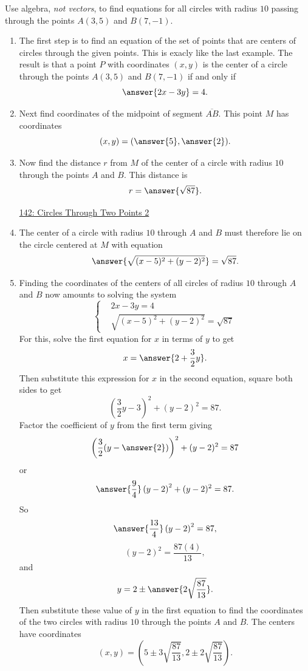 \documentclass{ximera}
\begin{document}
\begin{question} \label{Qdr383r7f3}
Use algebra, \emph{not vectors}, to find equations for all circles with radius $10$ passing through the points $A(3,5)$ and $B(7,-1)$.

\begin{explanation}
\begin{enumerate}
\item The first step is to find an equation of the set of points that are centers of circles through the given points. This is exacly like the last example. The result is that a point $P$ with coordinates $(x,y)$ is the center of a circle through the points $A(3,5)$ and $B(7,-1)$ if and only if
\[
   \answer{2x - 3y} = 4 .
\]

\item Next find coordinates of the midpoint of segment $\overline{AB}$. This point $M$ has coordinates
\[
   (x,y) = (\answer{5},\answer{2}) .
\] 

\item Now find the distance $r$ from $M$ of the center of a circle with radius $10$ through the points $A$ and $B$. This distance is
\[
   r = \answer{\sqrt{87}}.
\]

\begin{onlineOnly}
    \begin{center}
\end{center}
\end{onlineOnly}

\href{https://www.desmos.com/calculator/5hjdvplzkk}{142: Circles Through Two Points 2}



\item The center of a circle with radius $10$ through $A$ and $B$ must therefore lie on the circle centered at $M$ with equation 
\[
  \answer{\sqrt{(x-5)^2 + (y-2)^2}}   = \sqrt{87} .
\]

\item Finding the coordinates of the centers of all circles of radius $10$ through $A$ and $B$ now amounts to solving the system
\[
\begin{cases}
          & 2x - 3y = 4 \\
          &\sqrt{(x-5)^2 + (y-2)^2}   = \sqrt{87} 
\end{cases}
\]
For this, solve the first equation for $x$ in terms of $y$ to get
\[
    x = \answer{2 + \frac{3}{2}y} .
\]
Then substitute this expression for $x$ in the second equation, square both sides to get
\[
         \left( \frac{3}{2}y - 3\right)^2 + (y-2)^2 = 87.
\]
Factor the coefficient of $y$ from the first term giving
\[
   \left( \frac{3}{2}(y - \answer{2})\right)^2 + (y-2)^2 = 87 
\]
or
\[
     \answer{\frac{9}{4}} \left( y-2  \right)^2 + (y-2)^2 = 87 .
\]
So
\[
    \answer{\frac{13}{4}}  \left( y-2  \right)^2 = 87 ,
\]
\[
     (y-2)^2 = \frac{87(4)}{13},
\]
and
\[
    y = 2\pm \answer{2\sqrt{\frac{87}{13}}} .
\]
Then substitute these value of $y$ in the first equation to find the coordinates of the two circles with radius $10$ through the points $A$ and $B$. The centers have coordinates
\[
    (x,y) = \left( 5 \pm 3\sqrt{\frac{87}{13}}  , 2\pm 2\sqrt{\frac{87}{13}}  \right).
\]


\end{enumerate}
\end{explanation}
\end{question}
\end{document}
